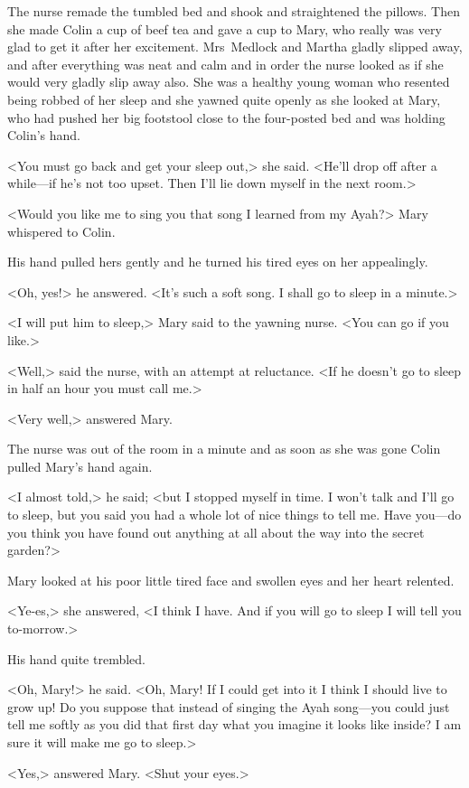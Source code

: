 The nurse remade the tumbled bed and shook and straightened the pillows. Then she made Colin a cup of beef tea and gave a cup to Mary, who really was very glad to get it after her excitement. Mrs~Medlock and Martha gladly slipped away, and after everything was neat and calm and in order the nurse looked as if she would very gladly slip away also. She was a healthy young woman who resented being robbed of her sleep and she yawned quite openly as she looked at Mary, who had pushed her big footstool close to the four-posted bed and was holding Colin's hand.

<You must go back and get your sleep out,> she said. <He'll drop off after a while—if he's not too upset. Then I'll lie down myself in the next room.>

<Would you like me to sing you that song I learned from my Ayah?> Mary whispered to Colin.

His hand pulled hers gently and he turned his tired eyes on her appealingly.

<Oh, yes!> he answered. <It's such a soft song. I shall go to sleep in a minute.>

<I will put him to sleep,> Mary said to the yawning nurse. <You can go if you like.>

<Well,> said the nurse, with an attempt at reluctance. <If he doesn't go to sleep in half an hour you must call me.>

<Very well,> answered Mary.

The nurse was out of the room in a minute and as soon as she was gone Colin pulled Mary's hand again.

<I almost told,> he said; <but I stopped myself in time. I won't talk and I'll go to sleep, but you said you had a whole lot of nice things to tell me. Have you—do you think you have found out anything at all about the way into the secret garden?>

Mary looked at his poor little tired face and swollen eyes and her heart relented.

<Ye-es,> she answered, <I think I have. And if you will go to sleep I will tell you to-morrow.>

His hand quite trembled.

<Oh, Mary!> he said. <Oh, Mary! If I could get into it I think I should live to grow up! Do you suppose that instead of singing the Ayah song—you could just tell me softly as you did that first day what you imagine it looks like inside? I am sure it will make me go to sleep.>

<Yes,> answered Mary. <Shut your eyes.>

